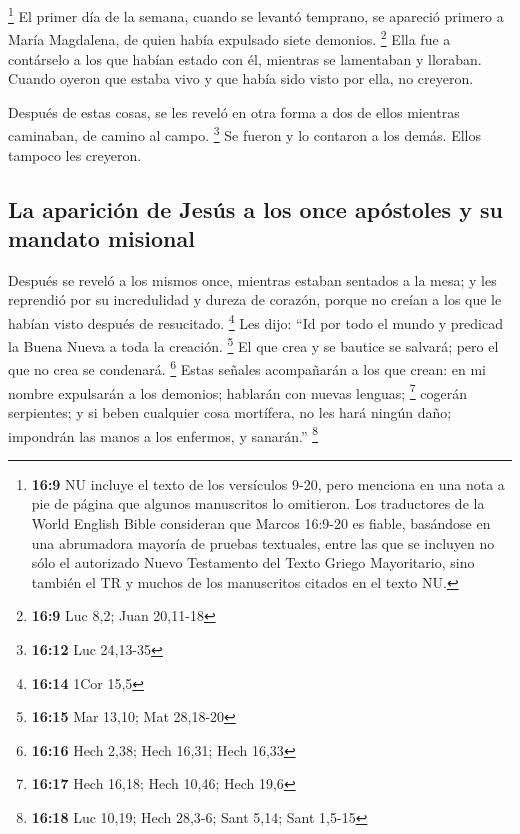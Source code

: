 \begin{paracol}{2}
 \footnote{\textbf{16:9} NU incluye el texto de los
  versículos 9-20, pero menciona en una nota a pie de página que algunos
  manuscritos lo omitieron. Los traductores de la World English Bible
  consideran que Marcos 16:9-20 es fiable, basándose en una abrumadora
  mayoría de pruebas textuales, entre las que se incluyen no sólo el
  autorizado Nuevo Testamento del Texto Griego Mayoritario, sino también
  el TR y muchos de los manuscritos citados en el texto NU.} El primer
día de la semana, cuando se levantó temprano, se apareció primero a
María Magdalena, de quien había expulsado siete demonios. \footnote{\textbf{16:9}
  Luc 8,2; Juan 20,11-18}  Ella fue a contárselo a los
que habían estado con él, mientras se lamentaban y lloraban.
 Cuando oyeron que estaba vivo y que había sido visto por
ella, no creyeron.

 Después de estas cosas, se les reveló en otra forma a
dos de ellos mientras caminaban, de camino al campo. \footnote{\textbf{16:12}
  Luc 24,13-35}  Se fueron y lo contaron a los demás.
Ellos tampoco les creyeron.

\hypertarget{la-apariciuxf3n-de-jesuxfas-a-los-once-apuxf3stoles-y-su-mandato-misional}{%
\subsection{La aparición de Jesús a los once apóstoles y su mandato
misional}\label{la-apariciuxf3n-de-jesuxfas-a-los-once-apuxf3stoles-y-su-mandato-misional}}

 Después se reveló a los mismos once, mientras estaban
sentados a la mesa; y les reprendió por su incredulidad y dureza de
corazón, porque no creían a los que le habían visto después de
resucitado. \footnote{\textbf{16:14} 1Cor 15,5}  Les
dijo: ``Id por todo el mundo y predicad la Buena Nueva a toda la
creación. \footnote{\textbf{16:15} Mar 13,10; Mat 28,18-20}
 El que crea y se bautice se salvará; pero el que no crea
se condenará. \footnote{\textbf{16:16} Hech 2,38; Hech 16,31; Hech 16,33}
 Estas señales acompañarán a los que crean: en mi nombre
expulsarán a los demonios; hablarán con nuevas lenguas; \footnote{\textbf{16:17}
  Hech 16,18; Hech 10,46; Hech 19,6}  cogerán serpientes;
y si beben cualquier cosa mortífera, no les hará ningún daño; impondrán
las manos a los enfermos, y sanarán.'' \footnote{\textbf{16:18} Luc
  10,19; Hech 28,3-6; Sant 5,14; Sant 1,5-15}


\end{paracol}
